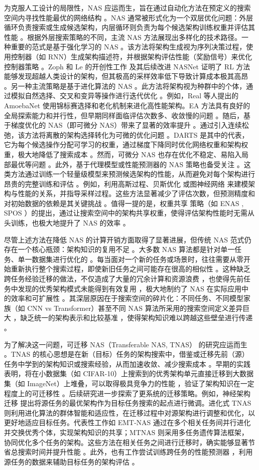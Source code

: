 \documentclass[../main.tex]{subfiles}
\begin{document}
为克服人工设计的局限性，NAS 应运而生，旨在通过自动化方法在预定义的搜索空间内寻找性能最优的网络结构 。NAS 通常被形式化为一个双层优化问题：外层循环负责搜索或生成候选架构，内层循环则负责为每个候选架构训练权重并评估其性能 。根据外层搜索策略的不同，主流 NAS 方法展现出多样化的技术路径。一种重要的范式是基于强化学习的 NAS 。该方法将架构生成视为序列决策过程，使用控制器（如 RNN）生成架构描述符，并根据架构评估性能（奖励信号）来优化控制器策略 。Zoph 和 Le 的开创性工作 及其后续改进 NASNet 证明了 RL 方法能够发现超越人类设计的架构，但其极高的采样效率低下导致计算成本极其高昂 。另一种主流策略是基于进化算法的 NAS 。此方法将架构视为种群中的个体，通过模拟自然选择、交叉和变异等操作进行迭代优化 。例如，Real 等人提出的 AmoebaNet 使用锦标赛选择和老化机制来进化高性能架构。EA 方法具有良好的全局探索能力和并行性，但早期同样面临评估次数多、收敛慢的问题 。随后，基于梯度优化的 NAS（即可微分 NAS）带来了显著的效率提升 。通过引入连续松弛，该方法将离散的架构选择转化为可微的优化问题 。DARTS 是其中的代表，它为每个候选操作分配可学习的权重，通过梯度下降同时优化网络权重和架构权重，极大地降低了搜索成本 。然而，可微分 NAS 也存在优化不稳定、易陷入局部最优等问题 。此外，基于代理模型或性能预测器的 NAS 策略也备受关注 。这类方法通过训练一个轻量级模型来预测候选架构的性能，从而避免对每个架构进行昂贵的完整训练和评估 。例如，利用高斯过程、贝斯优化 或图神经网络 来建模架构与性能的关系，并指导采样过程。这些方法显著减少了评估次数，但预测精度和对初始数据的依赖是其关键挑战 。值得一提的是，权重共享 策略（如 ENAS , SPOS ）的提出，通过让搜索空间中的架构共享权重，使得评估架构性能时无需从头训练，也极大地提升了 NAS 的效率 。

尽管上述方法在降低 NAS 的计算开销方面取得了显著进展，但传统 NAS 范式仍存在一个核心瓶颈：架构知识的复用不足 。大多数 NAS 算法都是针对单一任务、单一数据集进行优化的 。每当面对一个新的任务或场景时，往往需要从零开始重新执行整个搜索过程，即使新旧任务之间可能存在很高的相似性 。这种缺乏跨任务经验迁移的做法，不仅造成了大量的冗余计算和资源浪费 ，也使得先前任务中发现的优秀架构模式未能得到有效复用 ，极大地制约了 NAS 在实际应用中的效率和可扩展性 。其深层原因在于搜索空间的碎片化：不同任务、不同模型家族（如 CNN vs Transformer）甚至不同 NAS 算法所采用的搜索空间定义差异巨大 ，缺乏统一的架构表示和比较基准 ，使得架构知识难以跨越这些壁垒进行传递 。

为了解决这一问题，可迁移 NAS（Transferable NAS, TNAS） 的研究应运而生 。TNAS 的核心思想是在新（目标）任务的架构搜索中，借鉴或迁移先前（源）任务中学到的架构知识或搜索经验，从而加速收敛、减少搜索成本 。早期的实践 表明，将在小数据集（如 CIFAR-10）上搜索到的优秀架构单元直接迁移到大数据集（如 ImageNet）上堆叠，可以取得极具竞争力的性能 ，验证了架构知识在一定程度上的可迁移性 。后续研究进一步探索了更系统的迁移策略。例如，神经架构迁移 提出将源任务的最优架构作为目标任务搜索的起点进行微调。进化式 TNAS 则利用进化算法的群体智能和适应性，在迁移过程中对源架构进行调整和优化，以更好地适应目标任务。代表性工作如 EMT-NAS 通过在多个相关任务间并行进化并交换优秀个体，实现架构知识的共享；MTNAS 则采用多任务遗传算法框架，协同优化多个任务的架构。这些方法在相关任务之间进行迁移时，确实能够显著节省总搜索时间并提升性能 。此外，也有工作尝试训练跨任务的性能预测器 ，利用源任务的数据来辅助目标任务的架构评估 。
\end{document}
